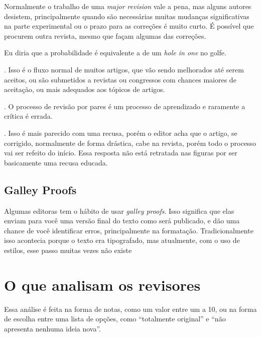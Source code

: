 \documentclass[openany]{book}
\begin{document}
 Normalmente o trabalho de uma \textit{major revision} vale a pena, mas alguns autores desistem, principalmente quando são necessárias muitas mudanças significativas na parte experimental ou o prazo para as correções é muito curto. É possível que procurem outra revista, mesmo que façam algumas das correções.

 Eu diria que a probabilidade é equivalente a de um \textit{hole in one} no golfe.

. Isso é o fluxo normal de muitos artigos, que vão sendo melhorados até serem aceitos, ou são submetidos a revistas ou congressos com chances maiores de aceitação, ou mais adequados aos tópicos de artigos.

. O processo de revisão por pares é um processo de aprendizado e raramente a crítica é errada.


. Isso é mais parecido com uma recusa, porém o editor acha que o artigo, se corrigido, normalmente de forma drástica, cabe na revista, porém todo o processo vai ser refeito do início. Essa resposta não está retratada nas figuras por ser basicamente uma recusa educada.

\subsection{Galley Proofs}

Algumas editoras tem o hábito de usar \textit{galley proofs}. Isso significa que elas enviam para você uma versão final do texto como será publicado, e dão uma chance de você identificar erros, principalmente na formatação. Tradicionalmente isso acontecia porque o texto era tipografado, mas atualmente, com o uso de estilos, esse passo muitas vezes não existe


\section{O que analisam os revisores}

 Essa análise é feita na forma de notas, como um valor entre um a 10, ou na forma de escolha entre uma lista de opções, como ``totalmente original'' e ``não apresenta nenhuma ideia nova''.
\end{document}
